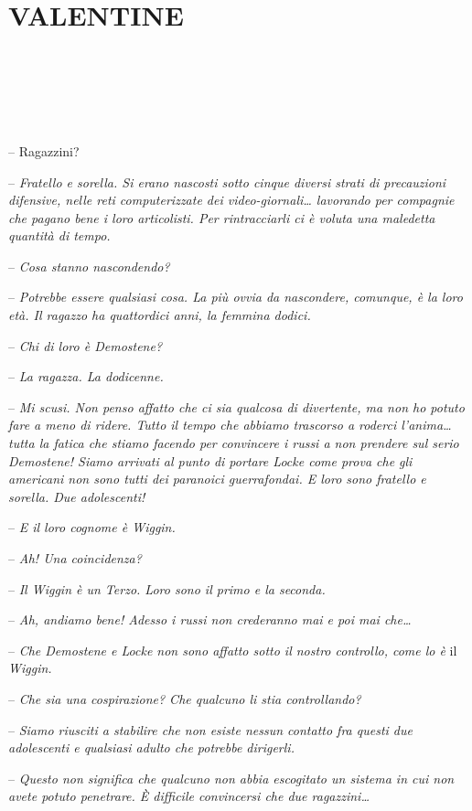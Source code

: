 \chapter{VALENTINE}

{~}

{~}

{~}

{-- Ragazzini?}

{-- \emph{Fratello e sorella. Si erano nascosti sotto cinque diversi
		strati di precauzioni difensive, nelle reti computerizzate dei
		video-giornali\ldots{} lavorando per compagnie che pagano bene i loro
		articolisti. Per rintracciarli ci è voluta una maledetta quantità di
		tempo.}}

{-- \emph{Cosa stanno nascondendo?}}

{-- \emph{Potrebbe essere qualsiasi cosa. La più ovvia da nascondere,
		comunque, è la loro età. Il ragazzo ha quattordici anni, la femmina
		dodici.}}

{-- \emph{Chi di loro è Demostene?}}

{-- \emph{La ragazza. La dodicenne.}}

{-- \emph{Mi scusi. Non penso affatto che ci sia qualcosa di divertente,
		ma non ho potuto fare a meno di ridere. Tutto il tempo che abbiamo
		trascorso a roderci l'anima\ldots{} tutta la fatica che stiamo facendo
		per convincere i russi a non prendere sul serio Demostene! Siamo
		arrivati al punto di portare Locke come prova che gli americani non sono
		tutti dei paranoici guerrafondai. E loro sono fratello e sorella. Due
		adolescenti!}}

{-- \emph{E il loro cognome è Wiggin.}}

{-- \emph{Ah! Una coincidenza?}}

{-- \emph{Il Wiggin è un Terzo. Loro sono il primo e la seconda.}}

{-- \emph{Ah, andiamo bene! Adesso i russi non crederanno mai e poi mai
		che\ldots{}}}

{-- \emph{Che Demostene e Locke non sono affatto sotto il nostro
		controllo, come lo è} il \emph{Wiggin.}}

{-- \emph{Che sia una cospirazione? Che qualcuno li stia controllando?}}

{-- \emph{Siamo riusciti a stabilire che non esiste nessun contatto fra
		questi due adolescenti e qualsiasi adulto che potrebbe dirigerli.}}

{-- \emph{Questo non significa che qualcuno non abbia escogitato un
		sistema in cui non avete potuto penetrare. È difficile convincersi che
		due ragazzini\ldots{}}}


